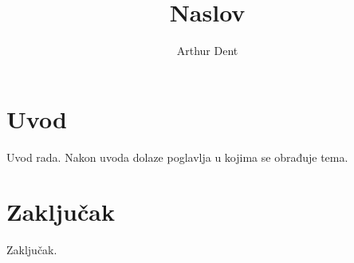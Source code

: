 \documentclass{ferseminar}
\begin{document}
\title{Naslov}

\author{Arthur Dent}


\maketitle

\tableofcontents

\chapter{Uvod}
Uvod rada. Nakon uvoda dolaze poglavlja u kojima se obrađuje tema.

\chapter{Zaključak}
Zaključak.



\end{document}
